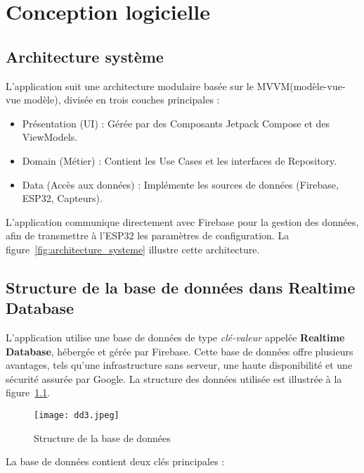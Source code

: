 \pagestyle{fancy}
\fancyhead{} %
\chapter{Conception logicielle}

\section{Architecture système}
L’application suit une architecture modulaire basée sur le MVVM(modèle-vue-vue modèle), divisée en trois couches principales :

\begin{itemize}
\item    Présentation (UI) : Gérée par des Composants Jetpack Compose et des ViewModels.

\item    Domain (Métier) : Contient les Use Cases et les interfaces de Repository.

\item    Data (Accès aux données) : Implémente les sources de données (Firebase, ESP32, Capteurs).
\end{itemize}
L'application communique directement avec Firebase pour la gestion des données, afin de transmettre à l'ESP32 les paramètres de configuration. La figure~\ref{fig:architecture_systeme} illustre cette architecture.

\section{Structure de la base de données dans Realtime Database}

L'application utilise une base de données de type \textit{clé-valeur} appelée \textbf{Realtime Database}, hébergée et gérée par Firebase. Cette base de données offre plusieurs avantages, tels qu'une infrastructure sans serveur, une haute disponibilité et une sécurité assurée par Google. La structure des données utilisée est illustrée à la figure~\ref{fig:structure_de_la_base_de_donnees}.

\begin{figure}[H]
   \centering
   \texttt{[image: dd3.jpeg]}
   \caption{Structure de la base de données}
   \label{fig:structure_de_la_base_de_donnees}
\end{figure}

La base de données contient deux clés principales :

